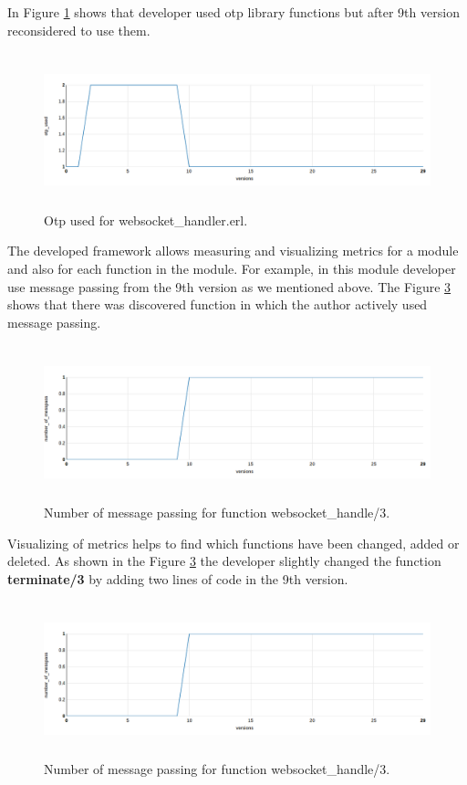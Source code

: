 In Figure \ref{fig:chat2} shows that developer used otp library functions but after 9th version reconsidered to use them.

\begin{figure}[ht]
	\centering
	\includegraphics[height=45mm]{figures/chat2.png}
	\caption{Otp used for websocket\_handler.erl.}
	\label{fig:chat2}
\end{figure}

The developed framework allows measuring and visualizing metrics for a module and also for each function in the module. For example, in this module developer use message passing from the 9th version as we mentioned above. The Figure \ref{fig:chat3} shows that there was discovered function in which the author actively used message passing.

\begin{figure}[h]
	\centering
	\includegraphics[height=45mm]{figures/chat3.png}
	\caption{Number of message passing for function websocket\_handle/3.}
	\label{fig:chat3}
\end{figure}

Visualizing of metrics helps to find which functions have been changed, added or deleted. As shown in the Figure \ref{fig:chat3} the developer slightly changed the function \textbf{terminate/3} by adding two lines of code in the 9th version.

\begin{figure}[ht]
	\centering
	\includegraphics[height=45mm]{figures/chat3.png}
	\caption{
		Number of message passing for function websocket\_handle/3.}
	\label{fig:chat3}
\end{figure}
 
